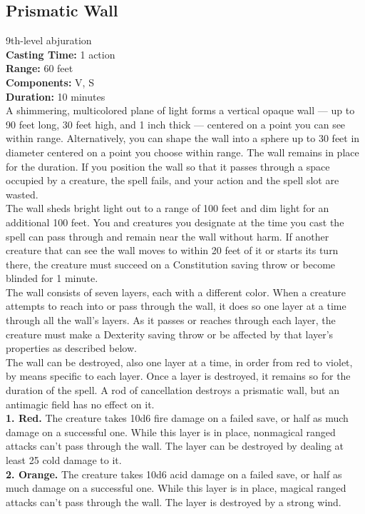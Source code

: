 \documentclass[11pt, A4paper, english]{article}
\begin{document}
		\subsection{Prismatic Wall}
9th-level abjuration \\
\textbf{Casting Time:} 1 action \\
\textbf{Range:} 60 feet \\
\textbf{Components:} V, S \\
\textbf{Duration:} 10 minutes \\
A shimmering, multicolored plane of light forms a vertical opaque wall — up to 90 feet long, 30 feet high, and 1 inch thick — centered on a point you can see within range. Alternatively, you can shape the wall into a sphere up to 30 feet in diameter centered on a point you choose within range. The wall remains in place for the duration. If you position the wall so that it passes through a space occupied by a creature, the spell fails, and your action and the spell slot are wasted. \\
The wall sheds bright light out to a range of 100 feet and dim light for an additional 100 feet. You and creatures you designate at the time you cast the spell can pass through and remain near the wall without harm. If another creature that can see the wall moves to within 20 feet of it or starts its turn there, the creature must succeed on a Constitution saving throw or become blinded for 1  minute. \\
The wall consists of seven layers, each with a different color. When a creature attempts to reach into or pass through the wall, it does so one layer at a time through all the wall’s layers. As it passes or reaches through each layer, the creature must make a Dexterity saving throw or be affected by that layer’s properties as described below. \\
The wall can be destroyed, also one layer at a time, in order from red to violet, by means specific to each layer. Once a layer is destroyed, it remains so for the duration of the spell. A rod of cancellation destroys a prismatic wall, but an antimagic field has no effect on it. \\
\textbf{1. Red.} The creature takes 10d6 fire damage on a failed save, or half as much damage on a successful one. While this layer is in place, nonmagical ranged attacks can’t pass through the wall. The layer can be destroyed by dealing at least 25 cold damage to it. \\
\textbf{2. Orange.} The creature takes 10d6 acid damage on a failed save, or half as much damage on a successful one. While this layer is in place, magical ranged attacks can’t pass through the wall. The layer is destroyed by a strong wind. \\
\end{document}
